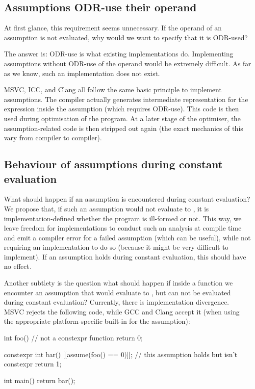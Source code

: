 \subsection{Assumptions ODR-use their operand}

At first glance, this requirement seems unnecessary. If the operand of an assumption is not evaluated, why would we want to specify that it is ODR-used?

The answer is: ODR-use is what existing implementations do. Implementing assumptions without ODR-use of the operand would be extremely difficult. As far as we know, such an implementation does not exist.

MSVC, ICC, and Clang all follow the same basic principle to implement assumptions. The compiler actually generates intermediate representation for the expression inside the assumption (which requires ODR-use). This code is then used during optimisation of the program. At a later stage of the optimiser, the assumption-related code is then stripped out again (the exact mechanics of this vary from compiler to compiler).

\subsection{Behaviour of assumptions during constant evaluation}

What should happen if an assumption is encountered during constant evaluation? We propose that, if such an assumption would not evaluate to , it is implementation-defined whether the program is ill-formed or not. This way, we leave freedom for implementations to conduct such an analysis at compile time and emit a compiler error for a failed assumption (which can be useful), while not requiring an implementation to do so (because it might be very difficult to implement). If an assumption holds during constant evaluation, this should have no effect.

Another subtlety is the question what should happen if inside a  function we encounter an assumption that would evaluate to , but can not be evaluated during constant evaluation? Currently, there is implementation divergence. MSVC rejects the following code, while GCC and Clang accept it (when using the appropriate platform-specific built-in for the assumption):

\begin{codeblock}
int foo() {     // not a constexpr function
  return 0; 
}

constexpr int bar() {
  [[assume(foo() == 0)]];  // this assumption holds but isn't constexpr
  return 1;
}

int main() {
  return bar();
}
\end{codeblock}

